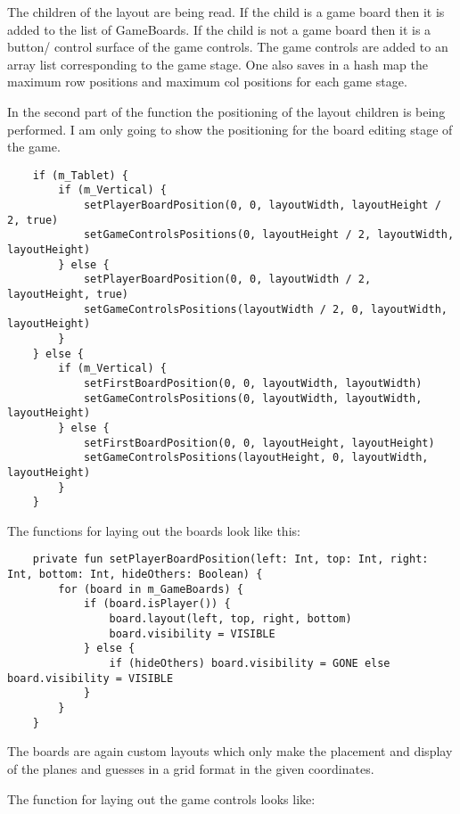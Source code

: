 The children of the layout are being read. If the child is a game board then it is added to the list of GameBoards. If the child is not a game board then it is a button/ control surface of the game controls. The game controls are added to an array list corresponding to the game stage. One also saves in a hash map the maximum row positions and maximum col positions for each game stage.

In the second part of the function the positioning of the layout children is being performed. I am only going to show the positioning for the board editing stage of the game.

\begin{lstlisting}
	if (m_Tablet) {
		if (m_Vertical) {
			setPlayerBoardPosition(0, 0, layoutWidth, layoutHeight / 2, true)
			setGameControlsPositions(0, layoutHeight / 2, layoutWidth, layoutHeight)
		} else {
			setPlayerBoardPosition(0, 0, layoutWidth / 2, layoutHeight, true)
			setGameControlsPositions(layoutWidth / 2, 0, layoutWidth, layoutHeight)
		}
	} else {
		if (m_Vertical) {
			setFirstBoardPosition(0, 0, layoutWidth, layoutWidth)
			setGameControlsPositions(0, layoutWidth, layoutWidth, layoutHeight)
		} else {
			setFirstBoardPosition(0, 0, layoutHeight, layoutHeight)
			setGameControlsPositions(layoutHeight, 0, layoutWidth, layoutHeight)
		}
	}
\end{lstlisting}

The functions for laying out the boards look like this:

\begin{lstlisting}
	private fun setPlayerBoardPosition(left: Int, top: Int, right: Int, bottom: Int, hideOthers: Boolean) {
		for (board in m_GameBoards) {
			if (board.isPlayer()) {
				board.layout(left, top, right, bottom)
				board.visibility = VISIBLE
			} else {
				if (hideOthers) board.visibility = GONE else board.visibility = VISIBLE
			}
		}
	}
\end{lstlisting}

The boards are again custom layouts which only make the placement and display of the planes and guesses in a grid format in the given coordinates.

The function for laying out the game controls looks like:

